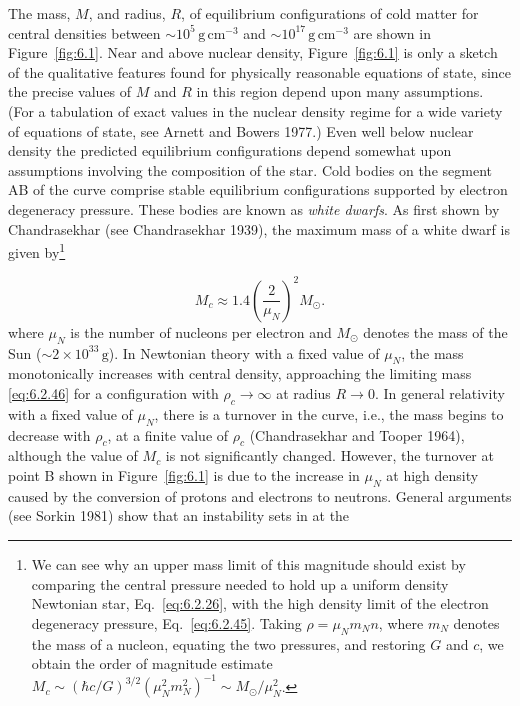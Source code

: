 The mass, \(M\), and radius, \(R\), of equilibrium configurations of cold matter
for central densities between \(\sim10^5\,\mathrm{g\,cm^{-3}}\) and
\(\sim10^{17}\,\mathrm{g\,cm^{-3}}\) are shown in Figure~\ref{fig:6.1}. Near and
above nuclear density, Figure~\ref{fig:6.1} is only a sketch of the qualitative
features found for physically reasonable equations of state, since the precise
values of \(M\) and \(R\) in this region depend upon many assumptions. (For a
tabulation of exact values in the nuclear density regime for a wide variety of
equations of state, see Arnett and Bowers 1977.) Even well below nuclear density
the predicted equilibrium configurations depend somewhat upon assumptions
involving the composition of the star. Cold bodies on the segment AB of the curve
comprise stable equilibrium configurations supported by electron degeneracy
pressure. These bodies are known as \emph{white dwarfs}. As first shown by
Chandrasekhar (see Chandrasekhar 1939), the maximum mass of a white dwarf is
given by\footnote{We can see why an upper mass limit of this magnitude should
exist by comparing the central pressure needed to hold up a uniform density
Newtonian star, Eq.~\eqref{eq:6.2.26}, with the high density limit of the
electron degeneracy pressure, Eq.~\eqref{eq:6.2.45}. Taking
\(\rho=\mu_Nm_Nn\), where \(m_N\) denotes the mass of a nucleon, equating the two
pressures, and restoring \(G\) and \(c\), we obtain the order of magnitude
estimate \(M_c\sim(\hbar c/G)^{3/2}(\mu_N^2m_N^2)^{-1}\sim M_\odot/\mu_N^2\).}

\begin{equation}
  M_c\approx1.4\left(\frac{2}{\mu_N}\right)^2M_\odot.
  \tag{6.2.46}\label{eq:6.2.46}
\end{equation}
where \(\mu_N\) is the number of nucleons per electron and \(M_\odot\) denotes
the mass of the Sun (\(\sim2\times10^{33}\,\mathrm{g}\)). In Newtonian theory
with a fixed value of \(\mu_N\), the mass monotonically increases with central
density, approaching the limiting mass \eqref{eq:6.2.46} for a configuration with
\(\rho_c\to\infty\) at radius \(R\to0\). In general relativity with a fixed value
of \(\mu_N\), there is a turnover in the curve, i.e., the mass begins to decrease
with \(\rho_c\), at a finite value of \(\rho_c\) (Chandrasekhar and Tooper 1964),
although the value of \(M_c\) is not significantly changed. However, the turnover
at point B shown in Figure~\ref{fig:6.1} is due to the increase in \(\mu_N\) at
high density caused by the conversion of protons and electrons to neutrons.
General arguments (see Sorkin 1981) show that an instability sets in at the
